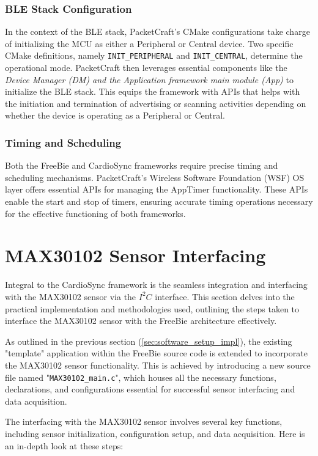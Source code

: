 \subsubsection{BLE Stack Configuration}

In the context of the BLE stack, PacketCraft's CMake configurations take charge of initializing the MCU as either a Peripheral or Central device. Two specific CMake definitions, namely \texttt{INIT\_PERIPHERAL} and \texttt{INIT\_CENTRAL}, determine the operational mode. PacketCraft then leverages essential components like the \textit{Device Manager (DM) and the Application framework main module (App)} to initialize the BLE stack. This equips the framework with APIs that helps with the initiation and termination of advertising or scanning activities depending on whether the device is operating as a Peripheral or Central.

\subsubsection{Timing and Scheduling}

Both the FreeBie and CardioSync frameworks require precise timing and scheduling mechanisms. PacketCraft's Wireless Software Foundation (WSF) OS layer offers essential APIs for managing the AppTimer functionality. These APIs enable the start and stop of timers, ensuring accurate timing operations necessary for the effective functioning of both frameworks.


\section{MAX30102 Sensor Interfacing}
Integral to the CardioSync framework is the seamless integration and interfacing with the MAX30102 sensor via the \(I^2C\) interface. This section delves into the practical implementation and methodologies used, outlining the steps taken to interface the MAX30102 sensor with the FreeBie architecture effectively.

\noindent As outlined in the previous section (\autoref{sec:software_setup_impl}), the existing "template" application within the FreeBie source code is extended to incorporate the MAX30102 sensor functionality. This is achieved by introducing a new source file named "\texttt{MAX30102\_main.c}", which houses all the necessary functions, declarations, and configurations essential for successful sensor interfacing and data acquisition.

\noindent The interfacing with the MAX30102 sensor involves several key functions, including sensor initialization, configuration setup, and data acquisition. Here is an in-depth look at these steps:

